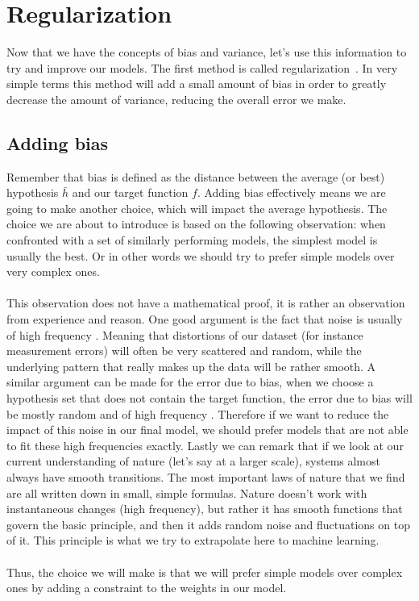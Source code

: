 \section{Regularization}
\label{sec:glm-regularization}
Now that we have the concepts of bias and variance, let's use this information to try and improve our models. The first method is called regularization~\cite{caltechmachinelearning}\cite{zou2005regularization}\cite{friedman2010regularization}. In very simple terms this method will add a small amount of bias in order to greatly decrease the amount of variance, reducing the overall error we make.
\subsection{Adding bias}
Remember that bias is defined as the distance between the average (or best) hypothesis $\bar{h}$ and our target function $f$. Adding bias effectively means we are going to make another choice, which will impact the average hypothesis. The choice we are about to introduce is based on the following observation: when confronted with a set of similarly performing models, the simplest model is usually the best. Or in other words we should try to prefer simple models over very complex ones. \\ \\
This observation does not have a mathematical proof, it is rather an observation from experience and reason. One good argument is the fact that noise is usually of high frequency \cite{caltechmachinelearning}. Meaning that distortions of our dataset (for instance measurement errors) will often be very scattered and random, while the underlying pattern that really makes up the data will be rather smooth. A similar argument can be made for the error due to bias, when we choose a hypothesis set that does not contain the target function, the error due to bias will be mostly random and of high frequency \cite{caltechmachinelearning}. Therefore if we want to reduce the impact of this noise in our final model, we should prefer models that are not able to fit these high frequencies exactly. Lastly we can remark that if we look at our current understanding of nature (let's say at a larger scale), systems almost always have smooth transitions. The most important laws of nature that we find are all written down in small, simple formulas. Nature doesn't work with instantaneous changes (high frequency), but rather it has smooth functions that govern the basic principle, and then it adds random noise and fluctuations on top of it. This principle is what we try to extrapolate here to machine learning.\\\\
Thus, the choice we will make is that we will prefer simple models over complex ones by adding a constraint to the weights in our model.
